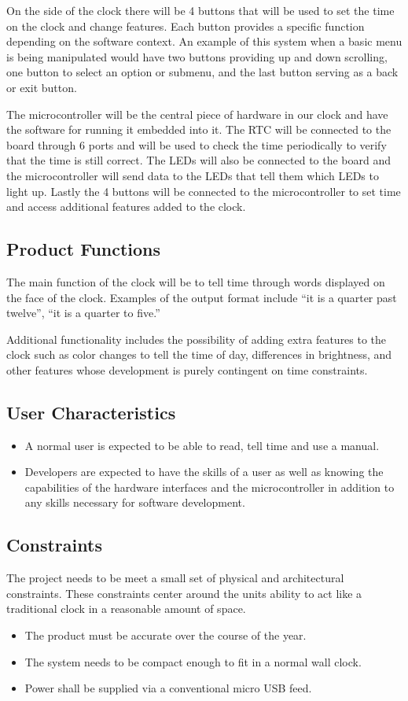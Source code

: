 \documentclass[10pt,draftclsnofoot,onecolumn]{IEEEtran}
\begin{document}
On the side of the clock there will be 4 buttons that will be used to set the time on the
clock and change features. Each button provides a specific function depending on the software
context. An example of this system when a basic menu is being manipulated would have two
buttons providing up and down scrolling, one button to select an option or submenu, and the
last button serving as a back or exit button.

The microcontroller will be the central piece of hardware in our clock and have the software
for running it embedded into it. The RTC will be connected to the board through 6 ports and
will be used to check the time periodically to verify that the time is still correct. The LEDs
will also be connected to the board and the microcontroller will send data to the LEDs that
tell them which LEDs to light up. Lastly the 4 buttons will be connected to the
microcontroller to set time and access additional features added to the clock.

\subsection{Product Functions}
The main function of the clock will be to tell time through words displayed on the face of the
clock. Examples of the output format include “it is a quarter past twelve”, “it is a quarter to
five.”

Additional functionality includes the possibility of adding extra features to the clock such as
color changes to tell the time of day, differences in brightness, and other features whose
development is purely contingent on time constraints.

\subsection{User Characteristics}
\begin{itemize}
  \item A normal user is expected to be able to read, tell time and use a manual.
  \item Developers are expected to have the skills of a user as well as knowing the
  capabilities of the hardware interfaces and the microcontroller in addition to any skills
  necessary for software development.
\end{itemize}

\subsection{Constraints}
The project needs to be meet a small set of physical and architectural constraints. These
constraints center around the units ability to act like a traditional clock in a reasonable
amount of space.
\begin{itemize}
	\item The product must be accurate over the course of the year.
	\item The system needs to be compact enough to fit in a normal wall clock.
	\item Power shall be supplied via a conventional micro USB feed.
\end{itemize}
\end{document}
